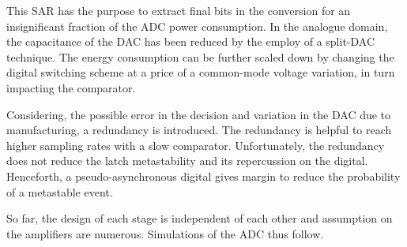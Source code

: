This SAR has the purpose to extract final bits in the conversion for an insignificant fraction of the ADC power consumption. In the analogue domain, the capacitance of the DAC has been reduced by the employ of a split-DAC technique. The energy consumption can be further scaled down by changing the digital switching scheme at a price of a common-mode voltage variation, in turn impacting the comparator.

Considering, the possible error in the decision and variation in the DAC due to manufacturing, a redundancy is introduced. The redundancy is helpful to reach higher sampling rates with a slow comparator. Unfortunately, the redundancy does not reduce the latch metastability and its repercussion on the digital. Henceforth, a pseudo-asynchronous digital gives margin to reduce the probability of a metastable event.

So far, the design of each stage is independent of each other and assumption on the amplifiers are numerous. Simulations of the ADC thus follow.






